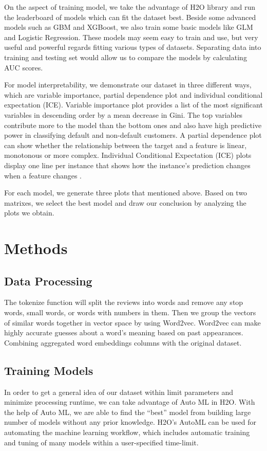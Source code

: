 \documentclass{article}
\begin{document}
On the aspect of training model, we take the advantage of H2O library and run the leaderboard of models which can fit the dataset best. Beside some advanced models such as GBM and XGBoost, we also train some basic models like GLM and Logistic Regression. These models may seem easy to train and use, but very useful and powerful regards fitting various types of datasets. Separating data into training and testing set would allow us to compare the models by calculating AUC scores. 

For model interpretability, we demonstrate our dataset in three different ways, which are variable importance, partial dependence plot and individual conditional expectation (ICE). Variable importance plot provides a list of the most significant variables in descending order by a mean decrease in Gini. The top variables contribute more to the model than the bottom ones and also have high predictive power in classifying default and non-default customers\cite{statistics}. A partial dependence plot can show whether the relationship between the target and a feature is linear, monotonous or more complex\cite{christoph}. Individual Conditional Expectation (ICE) plots display one line per instance that shows how the instance’s prediction changes when a feature changes\cite{christoph} \cite{plot}.

For each model, we generate three plots that mentioned above. Based on two matrixes, we select the best model and draw our conclusion by analyzing the plots we obtain. 



\section{Methods}
\label{sec:headings}


\subsection{Data Processing}
The tokenize function will split the reviews into words and remove any stop words, small words, or words with numbers in them. Then we group the vectors of similar words together in vector space by using Word2vec. Word2vec can make highly accurate guesses about a word’s meaning based on past appearances. Combining aggregated word embeddings columns with the original dataset.

\subsection{Training Models}
In order to get a general idea of our dataset within limit parameters and minimize processing runtime, we can take advantage of Auto ML in H2O. With the help of Auto ML, we are able to find the “best” model from building large number of models without any prior knowledge. H2O’s AutoML can be used for automating the machine learning workflow, which includes automatic training and tuning of many models within a user-specified time-limit\cite{AutoML}. 
\end{document}
